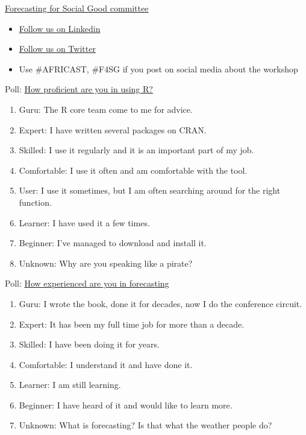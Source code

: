 \documentclass[
  14pt,
  ignorenonframetext,
  aspectratio=169,
]{beamer}
\providecommand{\tightlist}{%
  \setlength{\itemsep}{0pt}\setlength{\parskip}{0pt}}\usepackage{longtable,booktabs,array}
\begin{document}
\begin{frame}{\href{https://www.f4sg.org/}{Forecasting for Social Good
committee}}
\protect\hypertarget{forecasting-for-social-good-committee}{}
\begin{itemize}
\tightlist
\item
  \href{https://www.linkedin.com/company/f4sg/}{Follow us on Linkedin}
\item
  \href{https://twitter.com/FSG_forecast}{Follow us on Twitter}
\item
  Use \#AFRICAST, \#F4SG if you post on social media about the workshop
\end{itemize}
\end{frame}

\begin{frame}{Poll: \href{https://www.menti.com/alfmobtvo9wb}{How
proficient are you in using R?}}
\protect\hypertarget{poll-how-proficient-are-you-in-using-r}{}
\fontsize{14}{15}\sf

\begin{enumerate}
\tightlist
\item
  Guru: The R core team come to me for advice.
\item
  Expert: I have written several packages on CRAN.
\item
  Skilled: I use it regularly and it is an important part of my job.
\item
  Comfortable: I use it often and am comfortable with the tool.
\item
  User: I use it sometimes, but I am often searching around for the
  right function.
\item
  Learner: I have used it a few times.
\item
  Beginner: I've managed to download and install it.
\item
  Unknown: Why are you speaking like a pirate?
\end{enumerate}
\end{frame}

\begin{frame}{Poll: \href{https://www.menti.com/alfmobtvo9wb}{How
experienced are you in forecasting}}
\protect\hypertarget{poll-how-experienced-are-you-in-forecasting}{}
\begin{enumerate}
\tightlist
\item
  Guru: I wrote the book, done it for decades, now I do the conference
  circuit.
\item
  Expert: It has been my full time job for more than a decade.
\item
  Skilled: I have been doing it for years.
\item
  Comfortable: I understand it and have done it.
\item
  Learner: I am still learning.
\item
  Beginner: I have heard of it and would like to learn more.
\item
  Unknown: What is forecasting? Is that what the weather people do?
\end{enumerate}
\end{frame}
\end{document}
